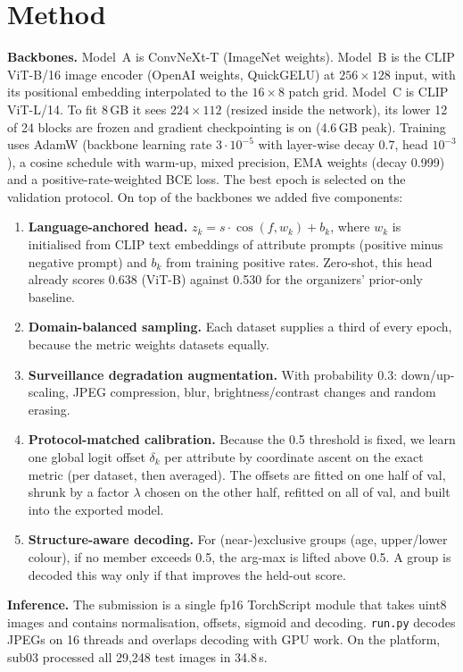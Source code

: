 \documentclass[10pt,a4paper]{article}
\begin{document}
\section{Method}
\textbf{Backbones.} Model~A is ConvNeXt-T (ImageNet weights). Model~B is the CLIP ViT-B/16 image encoder (OpenAI weights,
QuickGELU) at $256\times128$ input, with its positional embedding interpolated to the $16\times8$ patch grid.
Model~C is CLIP ViT-L/14. To fit 8\,GB it sees $224\times112$ (resized inside the network), its lower 12 of 24 blocks are frozen and gradient
checkpointing is on (4.6\,GB peak). Training uses AdamW (backbone learning rate $3\cdot10^{-5}$ with layer-wise decay 0.7, head
$10^{-3}$), a cosine schedule with warm-up, mixed precision, EMA weights (decay 0.999) and a positive-rate-weighted
BCE loss. The best epoch is selected on the validation protocol. On top of the backbones we added five components:
\begin{enumerate}[label=\textbf{N\arabic*}]
\item \textbf{Language-anchored head.} $z_k = s\cdot\cos(f,w_k)+b_k$, where $w_k$ is initialised from CLIP text embeddings of
attribute prompts (positive minus negative prompt) and $b_k$ from training positive rates. Zero-shot, this head
already scores 0.638 (ViT-B) against 0.530 for the organizers' prior-only baseline.
\item \textbf{Domain-balanced sampling.} Each dataset supplies a third of every epoch, because the metric weights datasets equally.
\item \textbf{Surveillance degradation augmentation.} With probability 0.3: down/up-scaling, JPEG compression, blur,
brightness/contrast changes and random erasing.
\item \textbf{Protocol-matched calibration.} Because the 0.5 threshold is fixed, we learn one global logit offset $\delta_k$ per
attribute by coordinate ascent on the exact metric (per dataset, then averaged). The offsets are fitted on one half of val,
shrunk by a factor $\lambda$ chosen on the other half, refitted on all of val, and built into the exported model.
\item \textbf{Structure-aware decoding.} For (near-)exclusive groups (age, upper/lower colour), if no member exceeds 0.5,
the arg-max is lifted above 0.5. A group is decoded this way only if that improves the held-out score.
\end{enumerate}
\textbf{Inference.} The submission is a single fp16 TorchScript module that takes uint8 images and contains normalisation,
offsets, sigmoid and decoding. \texttt{run.py} decodes JPEGs on 16 threads and overlaps decoding with GPU work.
On the platform, sub03 processed all 29,248 test images in 34.8\,s.
\end{document}

